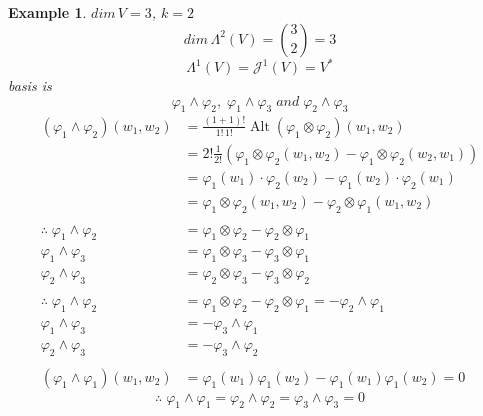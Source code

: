 \documentclass[12pt]{article}
\def\maj{\mathcal{J}}
\DeclareMathOperator{\alt}{Alt}
\newtheorem{example}{Example}[section]
\begin{document}
\begin{example}
$dim\,V = 3$, $k=2$
\[dim\,\Lambda^2(V) = {3 \choose 2} = 3\]
\[\Lambda^1(V) = \maj^1(V) = V^{*}\]
basis is \[\varphi_1\wedge\varphi_2 ,\; \varphi_1\wedge\varphi_3 \; and  \;\varphi_2\wedge\varphi_3\]
\begin{align*}
(\varphi_{1}\wedge\varphi_{2})(w_1,w_2)&= \frac{(1+1)!}{1!\,1!}\alt(\varphi_{1}\otimes\varphi_{2})(w_1,w_2)\\
&=2!\frac{1}{2!}(\varphi_{1}\otimes\varphi_{2}(w_1,w_2) -\varphi_{1}\otimes\varphi_{2}(w_2,w_1))\\
&=\varphi_1(w_1)\cdot\varphi_2(w_2) - \varphi_1(w_2)\cdot\varphi_2(w_1) \\
&=\varphi_{1}\otimes\varphi_{2}(w_1,w_2) - \varphi_{2}\otimes\varphi_{1}(w_1,w_2)\\
&\quad\\
\therefore \; \varphi_1\wedge\varphi_2 & = \varphi_{1}\otimes\varphi_{2} -\varphi_{2}\otimes\varphi_{1}\\
 \varphi_1\wedge\varphi_3 & = \varphi_{1}\otimes\varphi_{3} -\varphi_{3}\otimes\varphi_{1}\\
 \varphi_2\wedge\varphi_3 & = \varphi_{2}\otimes\varphi_{3} -\varphi_{3}\otimes\varphi_{2}\\
&\quad\\
\therefore \; \varphi_1\wedge\varphi_2 & = \varphi_{1}\otimes\varphi_{2} -\varphi_{2}\otimes\varphi_{1} = - \varphi_2\wedge\varphi_1\\
\varphi_1\wedge\varphi_3 &= -\varphi_3\wedge\varphi_1\\
\varphi_2\wedge\varphi_3 &= -\varphi_3\wedge\varphi_2\\
&\quad\\
(\varphi_1\wedge\varphi_1)(w_1, w_2)  &= \varphi_1(w_1)\varphi_1(w_2) - \varphi_1(w_1)\varphi_1(w_2) =0
\end{align*}
\[\therefore \; \boxed{\varphi_1\wedge\varphi_1 = \varphi_2\wedge\varphi_2 = \varphi_3\wedge\varphi_3 = 0}\]
\end{example}
\end{document}
